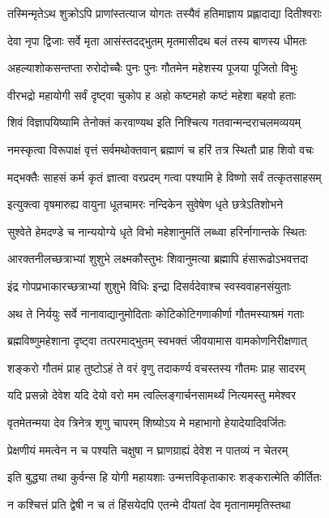 \twolineshloka
{तस्मिन्मृतेऽथ शुक्रोऽपि प्राणांस्तत्याज योगतः}
{तस्यैवं हतिमाज्ञाय प्रह्लादाद्या दितीश्वराः}%

\twolineshloka
{देवा नृपा द्विजाः सर्वे मृता आसंस्तदद्भुतम्}
{मृतमासीदथ बलं तस्य बाणस्य धीमतः}%

\twolineshloka
{अहल्याशोकसन्तप्ता रुरोदोच्चैः पुनः पुनः}
{गौतमेन महेशस्य पूजया पूजितो विभुः}%

\twolineshloka
{वीरभद्रो महायोगी सर्वं दृष्ट्वा चुकोप ह}
{अहो कष्टमहो कष्टं महेशा बहवो हताः}%

\twolineshloka
{शिवं विज्ञापयिष्यामि तेनोक्तं करवाण्यथ}
{इति निश्चित्य गतवान्मन्दराचलमव्ययम्}%

\twolineshloka
{नमस्कृत्वा विरूपाक्षं वृत्तं सर्वमथोक्तवान्}
{ब्रह्माणं च हरिं तत्र स्थितौ प्राह शिवो वचः}%

\twolineshloka
{मद्भक्तैः साहसं कर्म कृतं ज्ञात्वा वरप्रदम्}
{गत्वा पश्यामि हे विष्णो सर्वं तत्कृतसाहसम्}%

\twolineshloka
{इत्युक्त्वा वृषमारुह्य वायुना धूतचामरः}
{नन्दिकेन सुवेषेण धृते छत्रेऽतिशोभने}%

\twolineshloka
{सुश्वेते हेमदण्डे च नान्ययोग्ये धृते विभो}
{महेशानुमतिं लब्ध्वा हरिर्नागान्तके स्थितः}%

\twolineshloka
{आरक्तनीलच्छत्राभ्यां शुशुभे लक्ष्मकौस्तुभः}
{शिवानुमत्या ब्रह्मापि हंसारूढोऽभवत्तदा}%

\twolineshloka
{इंद्र गोपप्रभाकारच्छत्राभ्यां शुशुभे विधिः}
{इन्द्रा दिसर्वदेवाश्च स्वस्ववाहनसंयुताः}%

\twolineshloka
{अथ ते निर्ययुः सर्वे नानावाद्यानुमोदिताः}
{कोटिकोटिगणाकीर्णा गौतमस्याश्रमं गताः}%

\twolineshloka
{ब्रह्मविष्णुमहेशाना दृष्ट्वा तत्परमाद्भुतम्}
{स्वभक्तं जीवयामास वामकोणनिरीक्षणात्}%

\twolineshloka
{शङ्करो गौतमं प्राह तुष्टोऽहं ते वरं वृणु}
{तदाकर्ण्य वचस्तस्य गौतमः प्राह सादरम्}%

\twolineshloka
{यदि प्रसन्नो देवेश यदि देयो वरो मम}
{त्वल्लिङ्गार्चनसामर्थ्यं नित्यमस्तु ममेश्वर}%

\twolineshloka
{वृतमेतन्मया देव त्रिनेत्र शृणु चापरम्}
{शिष्योऽय मे महाभागो हेयादेयादिवर्जितः}%

\twolineshloka
{प्रेक्षणीयं ममत्वेन न च पश्यति चक्षुषा}
{न घ्राणग्राह्यं देवेश न पातव्यं न चेतरम्}%

\twolineshloka
{इति बुद्ध्या तथा कुर्वन्स हि योगी महायशाः}
{उन्मत्तविकृताकारः शङ्करात्मेति कीर्तितः}%

\twolineshloka
{न कश्चित्तं प्रति द्वेषी न च तं हिंसयेदपि}
{एतन्मे दीयतां देव मृतानाममृतिस्तथा}%

